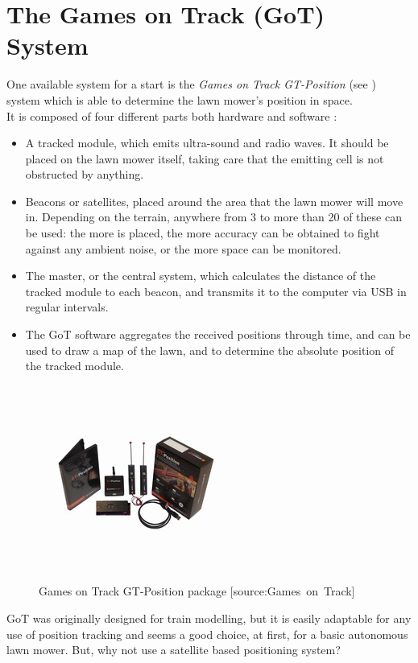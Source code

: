 \section{The Games on Track (GoT) System}
One available system for a start is the \emph{Games on Track GT-Position} (see ) system which is able to determine the lawn mower's position in space.\\
%
It is composed of four different parts both hardware and software \cite{GOTWebsitePos} :
\begin{itemize}
	\item A tracked module, which emits ultra-sound and radio waves. It should be placed on the lawn mower itself, taking care that the emitting cell is not obstructed by anything.
	\item Beacons or satellites, placed around the area that the lawn mower will move in. Depending on the terrain, anywhere from 3 to more than 20 of these can be used: the more is placed, the more accuracy can be obtained to fight against any ambient noise, or the more space can be monitored.
	\item The master, or the central system, which calculates the distance of the tracked module to each beacon, and transmits it to the computer via USB in regular intervals.
	\item The GoT software aggregates the received positions through time, and can be used to draw a map of the lawn, and to determine the absolute position of the tracked module.
\end{itemize}

\begin{figure}[H]
\centering
\includegraphics[scale=1.1]{figures/gotSystem.jpg} 
\caption{Games on Track GT-Position package [source:Games\ on\ Track]} 
\label{fig:gotsystem}
\end{figure}
\noindent

GoT was originally designed for train modelling, but it is easily adaptable for any use of position tracking and seems a good choice, at first, for a basic autonomous lawn mower.
But, why not use a satellite based positioning system?